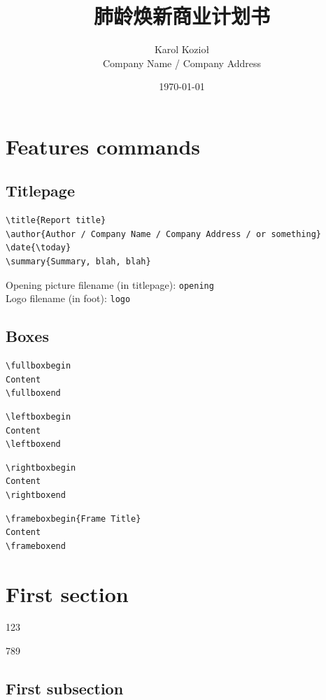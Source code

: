 \documentclass[12pt]{ctexart}
\title{\textbf{肺龄焕新}商业计划书}
\author{Karol Kozioł\\Company Name / Company Address}
\date{\today}
\begin{document}
\maketitle

\tableofcontents
\clearpage

\section{Features commands}

\subsection{Titlepage}

\begin{verbatim}
\title{Report title}
\author{Author / Company Name / Company Address / or something}
\date{\today}
\summary{Summary, blah, blah}
\end{verbatim}

\noindent
Opening picture filename (in titlepage): \texttt{opening}\\
Logo filename (in foot): \texttt{logo}

\subsection{Boxes}

\begin{verbatim}
\fullboxbegin
Content
\fullboxend
\end{verbatim}

\begin{verbatim}
\leftboxbegin
Content
\leftboxend
\end{verbatim}

\begin{verbatim}
\rightboxbegin
Content
\rightboxend
\end{verbatim}

\begin{verbatim}
\frameboxbegin{Frame Title}
Content
\frameboxend
\end{verbatim}

\newpage

\section{First section}
123

\fullboxend

789

\subsection{First subsection}
\lipsum[1]
\end{document}
